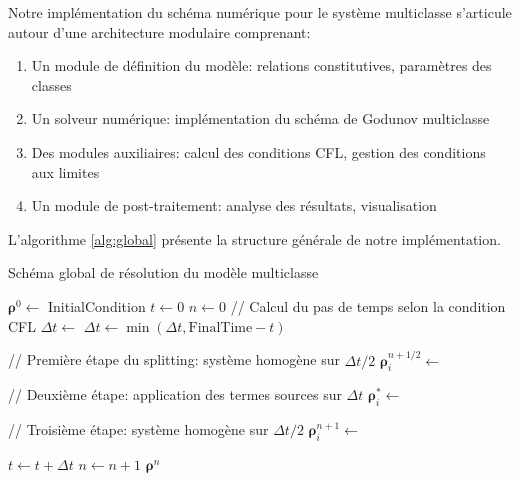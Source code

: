 Notre implémentation du schéma numérique pour le système multiclasse s'articule autour d'une architecture modulaire comprenant:

\begin{enumerate}
\item Un module de définition du modèle: relations constitutives, paramètres des classes
\item Un solveur numérique: implémentation du schéma de Godunov multiclasse
\item Des modules auxiliaires: calcul des conditions CFL, gestion des conditions aux limites
\item Un module de post-traitement: analyse des résultats, visualisation
\end{enumerate}

L'algorithme \ref{alg:global} présente la structure générale de notre implémentation.

\begin{algorithm}[htbp]
\caption{Schéma global de résolution du modèle multiclasse}
\begin{algorithmic}[1]
    \State $\boldsymbol{\rho}^0 \gets$ InitialCondition
    \State $t \gets 0$
    \State $n \gets 0$
        \State // Calcul du pas de temps selon la condition CFL
        \State $\Delta t \gets$ 
        \State $\Delta t \gets \min(\Delta t, \text{FinalTime} - t)$
        
        \State // Première étape du splitting: système homogène sur $\Delta t/2$
            \State $\boldsymbol{\rho}_i^{n+1/2} \gets$ 
        \EndFor
        
        \State // Deuxième étape: application des termes sources sur $\Delta t$
            \State $\boldsymbol{\rho}_i^* \gets$ 
        \EndFor
        
        \State // Troisième étape: système homogène sur $\Delta t/2$
            \State $\boldsymbol{\rho}_i^{n+1} \gets$ 
        \EndFor
        
        \State $t \gets t + \Delta t$
        \State $n \gets n + 1$
    \EndWhile
    \State \Return $\boldsymbol{\rho}^n$
\EndFunction
\end{algorithmic}
\label{alg:global}
\end{algorithm}

